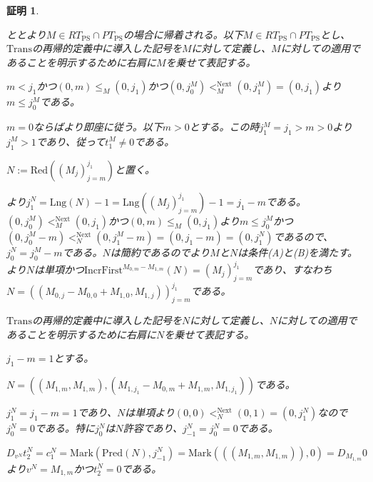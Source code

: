 \documentclass[dvipdfmx,uplatex]{jsarticle}
\theoremstyle{customnonumberbreakfortheorem}
\theoremstyle{customnonumberbreakforproof}
\newtheorem{hideableproof}{証明}
\begin{document}
\begin{hideableproof}
	\begin{indented}
		\item {}ととより\(M \in RT_{\textrm{PS}} \cap PT_{\textrm{PS}}\)の場合に帰着される。以下\(M \in RT_{\textrm{PS}} \cap PT_{\textrm{PS}}\)とし、\(\textrm{Trans}\)の再帰的定義中に導入した記号を\(M\)に対して定義し、\(M\)に対しての適用であることを明示するために右肩に\(M\)を乗せて表記する。
		\item \(m < j_1\)かつ\((0,m) \leq_M (0,j_1)\)かつ\((0,j_0^M) <_M^{\textrm{Next}} (0,j_1^M) = (0,j_1)\)より\(m \leq j_0^M\)である。
		\item \(m = 0\)ならばより即座に従う。以下\(m > 0\)とする。この時\(j_1^M = j_1 > m > 0\)より\(j_1^M > 1\)であり、従って\(t_1^M \neq 0\)である。
		\item \(N := \textrm{Red}((M_j)_{j=m}^{j_1})\)と置く。
		\item {}より\(j_1^N = \textrm{Lng}(N)-1 = \textrm{Lng}((M_j)_{j=m}^{j_1})-1 = j_1-m\)である。\((0,j_0^M) <_M^{\textrm{Next}} (0,j_1)\)かつ\((0,m) \leq_M (0,j_1)\)より\(m \leq j_0^M\)かつ\((0,j_0^M-m) <_N^{\textrm{Next}} (0,j_1^M-m) = (0,j_1-m) = (0,j_1^N)\)であるので、\(j_0^N = j_0^M-m\)である。\(N\)は簡約であるのでより\(M\)と\(N\)は条件(A)と(B)を満たす。より\(N\)は単項かつ\(\textrm{IncrFirst}^{M_{0,m}-M_{1,m}}(N) = (M_j)_{j=m}^{j_1}\)であり、すなわち\(N = ((M_{0,j}-M_{0,0}+M_{1,0},M_{1,j}))_{j=m}^{j_1}\)である。
		\item \(\textrm{Trans}\)の再帰的定義中に導入した記号を\(N\)に対して定義し、\(N\)に対しての適用であることを明示するために右肩に\(N\)を乗せて表記する。
		\item
		\item \(j_1-m = 1\)とする。
		\begin{indented}
			\item \(N = ((M_{1,m},M_{1,m}),(M_{1,j_1}-M_{0,m}+M_{1,m},M_{1,j_1}))\)である。
			\item \(j_1^N = j_1-m = 1\)であり、\(N\)は単項より\((0,0) <_N^{\textrm{Next}} (0,1) = (0,j_1^N)\)なので\(j_0^N = 0\)である。特に\(j_0^N\)は\(N\)許容であり、\(j_{-1}^N = j_0^N = 0\)である。
			\item \(D_{v^N} t_2^N = c_1^N = \textrm{Mark}(\textrm{Pred}(N),j_{-1}^N) = \textrm{Mark}(((M_{1,m},M_{1,m})),0) = D_{M_{1,m}} 0\)より\(v^N = M_{1,m}\)かつ\(t_2^N = 0\)である。

\end{indented}
\end{indented}
\end{hideableproof}
\end{document}
